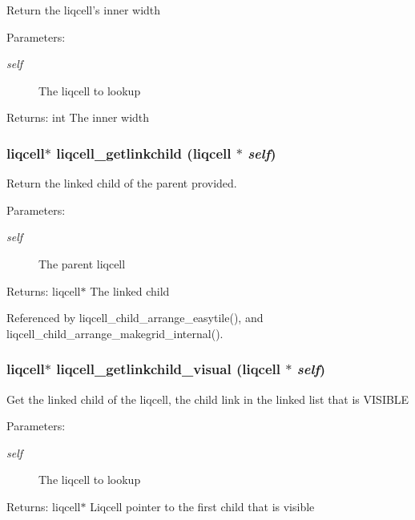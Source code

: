 Return the liqcell's inner width \begin{Desc}
\item[Parameters:]
\begin{description}
\item[{\em self}]The liqcell to lookup \end{description}
\end{Desc}
\begin{Desc}
\item[Returns:]int The inner width \end{Desc}
\subsubsection[{liqcell\_\-getlinkchild}]{\setlength{\rightskip}{0pt plus 5cm}liqcell$\ast$ liqcell\_\-getlinkchild (liqcell $\ast$ {\em self})}\label{d5/da2/liqcell_8c_a1bfa8ed04347c6463eb2af7ba302144}


Return the linked child of the parent provided. \begin{Desc}
\item[Parameters:]
\begin{description}
\item[{\em self}]The parent liqcell \end{description}
\end{Desc}
\begin{Desc}
\item[Returns:]liqcell$\ast$ The linked child \end{Desc}


Referenced by liqcell\_\-child\_\-arrange\_\-easytile(), and liqcell\_\-child\_\-arrange\_\-makegrid\_\-internal().
\subsubsection[{liqcell\_\-getlinkchild\_\-visual}]{\setlength{\rightskip}{0pt plus 5cm}liqcell$\ast$ liqcell\_\-getlinkchild\_\-visual (liqcell $\ast$ {\em self})}\label{d5/da2/liqcell_8c_5e6e1ee06c97ff0f18831d82ff943705}


Get the linked child of the liqcell, the child link in the linked list that is VISIBLE \begin{Desc}
\item[Parameters:]
\begin{description}
\item[{\em self}]The liqcell to lookup \end{description}
\end{Desc}
\begin{Desc}
\item[Returns:]liqcell$\ast$ Liqcell pointer to the first child that is visible \end{Desc}
